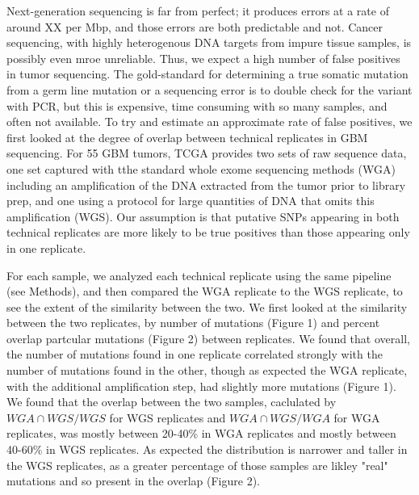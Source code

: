 \documentclass[11pt]{article} %
\begin{document}
Next-generation sequencing is far from perfect; it produces errors at a rate of around XX per Mbp, and those errors are both predictable and not. Cancer sequencing, with highly heterogenous DNA targets from impure tissue samples, is possibly even mroe unreliable. Thus, we expect a high number of false positives in tumor sequencing. The gold-standard for determining a true somatic mutation from a germ line mutation or a sequencing error is to double check for the variant with PCR, but this is expensive, time consuming with so many samples, and often not available. To try and estimate an approximate rate of false positives, we first looked at the degree of overlap between technical replicates in GBM sequencing. For 55 GBM tumors, TCGA provides two sets of raw sequence data, one set captured with tthe standard whole exome sequencing methods (WGA) including an amplification of the DNA extracted from the tumor prior to library prep, and one using a protocol for large quantities of DNA that omits this amplification (WGS). Our assumption is that putative SNPs appearing in both technical replicates are more likely to be true positives than those appearing only in one replicate.

For each sample, we analyzed each technical replicate using the same pipeline (see Methods), and then compared the WGA replicate to the WGS replicate, to see the extent of the similarity between the two. We first looked at the similarity between the two replicates, by number of mutations (Figure 1) and percent overlap partcular mutations (Figure 2) between replicates. We found that overall, the number of mutations found in one replicate correlated strongly with the number of mutations found in the other, though as expected the WGA replicate, with the additional amplification step, had slightly more mutations (Figure 1). We found that the overlap between the two samples, caclulated by $WGA \cap WGS/WGS$ for WGS replicates and $WGA \cap WGS/WGA$ for WGA replicates, was mostly between 20-40\% in WGA replicates and mostly between 40-60\% in WGS replicates. As expected the distribution is narrower and taller in the WGS replicates, as a greater percentage of those samples are likley "real" mutations and so present in the overlap (Figure 2).
\end{document}
